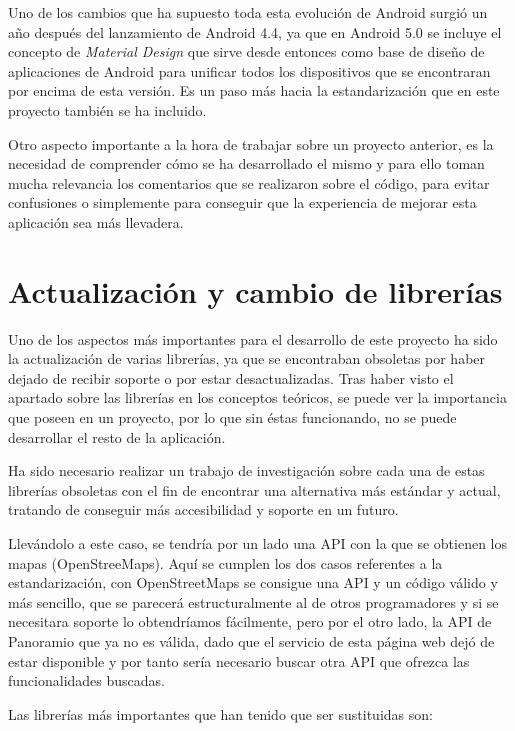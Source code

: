 Uno de los cambios que ha supuesto toda esta evolución de Android surgió un año después del lanzamiento de Android 4.4, ya que en Android 5.0 se incluye el concepto de \textit{Material Design} que sirve desde entonces como base de diseño de aplicaciones de Android para unificar todos los dispositivos que se encontraran por encima de esta versión. Es un paso más hacia la estandarización que en este proyecto también se ha incluido.

Otro aspecto importante a la hora de trabajar sobre un proyecto anterior, es la necesidad de comprender cómo se ha desarrollado el mismo y para ello toman mucha relevancia los comentarios que se realizaron sobre el código, para evitar confusiones o simplemente para conseguir que la experiencia de mejorar esta aplicación sea más llevadera.



\section{Actualización y cambio de librerías}

Uno de los aspectos más importantes para el desarrollo de este proyecto ha sido la actualización de varias librerías, ya que se encontraban obsoletas por haber dejado de recibir soporte o por estar desactualizadas. Tras haber visto el apartado sobre las librerías en los conceptos teóricos, se puede ver la importancia que poseen en un proyecto, por lo que sin éstas funcionando, no se puede desarrollar el resto de la aplicación.

Ha sido necesario realizar un trabajo de investigación sobre cada una de estas librerías obsoletas con el fin de encontrar una alternativa más estándar y actual, tratando de conseguir más accesibilidad y soporte en un futuro.

Llevándolo a este caso, se tendría por un lado una API con la que se obtienen los mapas (OpenStreeMaps). Aquí se cumplen los dos casos referentes a la estandarización, con OpenStreetMaps se consigue una API y un código válido y más sencillo, que se parecerá estructuralmente al de otros programadores y si se necesitara soporte lo obtendríamos fácilmente, pero por el otro lado, la API de Panoramio que ya no es válida, dado que el servicio de esta página web dejó de estar disponible y por tanto sería necesario buscar otra API que ofrezca las funcionalidades buscadas.

Las librerías más importantes que han tenido que ser sustituidas son:

